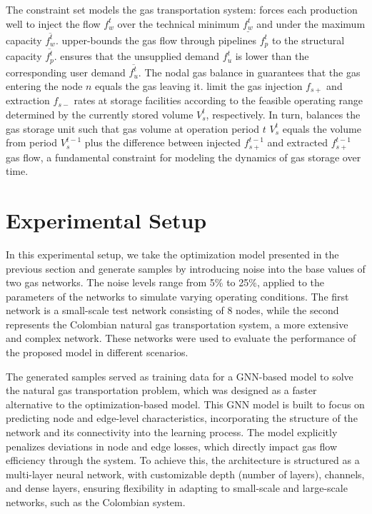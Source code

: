 The constraint set models the gas transportation system:  forces each production well to inject the flow $f_{w}^t$ over the technical minimum $\underline{f_{w}^t}$ and under the maximum capacity $\overline{f_{w}^t}$.  upper-bounds the gas flow through pipelines $f_{p}^t$ to the structural capacity $\overline{f_{p}^t}$.  ensures that the unsupplied demand $f_{u}^{t}$ is lower than the corresponding user demand $\overline{f_{u}^{t}}$. The nodal gas balance in  guarantees that the gas entering the node $n$ equals the gas leaving it.  limit the gas injection $f_{s+}$  and extraction $f_{s-}$ rates at storage facilities according to the feasible operating range determined by the currently stored volume $V_{s}^t$, respectively. In turn,  balances the gas storage unit such that gas volume at operation period $t$ $V_{s}^t$ equals the volume from period $V_{s}^{t-1}$ plus the difference between injected $f_{s+}^{t-1}$ and extracted $f_{s+}^{t-1}$ gas flow, a fundamental constraint for modeling the dynamics of gas storage over time. 

\section{Experimental Setup}



In this experimental setup, we take the optimization model presented in the previous section and generate samples by introducing noise into the base values of two gas networks. The noise levels range from 5\% to 25\%, applied to the parameters of the networks to simulate varying operating conditions. The first network is a small-scale test network consisting of 8 nodes, while the second represents the Colombian natural gas transportation system, a more extensive and complex network. These networks were used to evaluate the performance of the proposed model in different scenarios.

The generated samples served as training data for a GNN-based model to solve the natural gas transportation problem, which was designed as a faster alternative to the optimization-based model. This GNN model is built to focus on predicting node and edge-level characteristics, incorporating the structure of the network and its connectivity into the learning process. The model explicitly penalizes deviations in node and edge losses, which directly impact gas flow efficiency through the system. To achieve this, the architecture is structured as a multi-layer neural network, with customizable depth (number of layers), channels, and dense layers, ensuring flexibility in adapting to small-scale and large-scale networks, such as the Colombian system.



